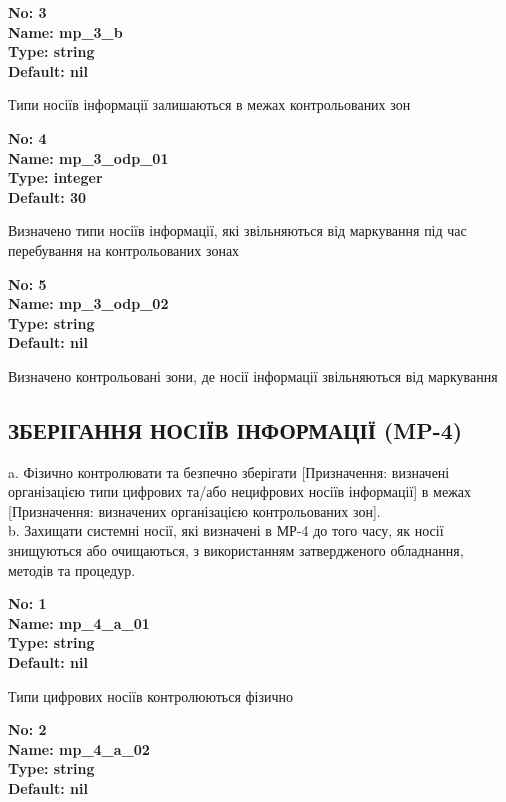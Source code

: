 \documentclass{article}
\begin{document}
{\footnotesize\bfseries
No: 3\\
Name: mp\_\allowbreak{}3\_\allowbreak{}b\\
Type: string\\
Default: nil
}

{\footnotesize Типи носіїв інформації залишаються в межах контрольованих зон}


{\footnotesize\bfseries
No: 4\\
Name: mp\_\allowbreak{}3\_\allowbreak{}odp\_\allowbreak{}01\\
Type: integer\\
Default: 30
}

{\footnotesize Визначено типи носіїв інформації, які звільняються від маркування під час перебування на контрольованих зонах}


{\footnotesize\bfseries
No: 5\\
Name: mp\_\allowbreak{}3\_\allowbreak{}odp\_\allowbreak{}02\\
Type: string\\
Default: nil
}

{\footnotesize Визначено контрольовані зони, де носії інформації звільняються від маркування}




\subsection{ЗБЕРІГАННЯ НОСІЇВ ІНФОРМАЦІЇ (MP-4)}
a. Фізично контролювати та безпечно зберігати [Призначення: визначені організацією типи цифрових та/або нецифрових носіїв інформації] в межах [Призначення: визначених організацією контрольованих зон].\\ 
b. Захищати системні носії, які визначені в МР-4 до того часу, як носії знищуються або очищаються, з використанням затвердженого обладнання, методів та процедур.

\vspace{10pt}
{\footnotesize\bfseries
No: 1\\
Name: mp\_\allowbreak{}4\_\allowbreak{}a\_\allowbreak{}01\\
Type: string\\
Default: nil
}

{\footnotesize Типи цифрових носіїв контролюються фізично}


{\footnotesize\bfseries
No: 2\\
Name: mp\_\allowbreak{}4\_\allowbreak{}a\_\allowbreak{}02\\
Type: string\\
Default: nil
}
\end{document}
